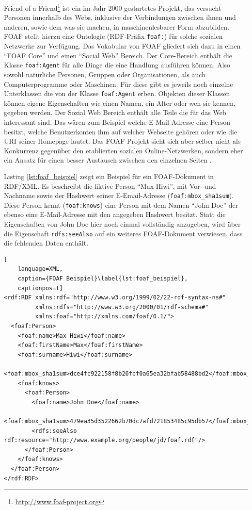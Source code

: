Friend of a Friend\footnote{\url{http://www.foaf-project.org}} ist ein im Jahr 2000 gestartetes Projekt, das versucht Personen innerhalb des Webs, inklusive der Verbindungen zwischen ihnen und anderen, sowie dem was sie machen, in maschinenlesbarer Form abzubilden. FOAF stellt hierzu eine Ontologie \cite{Brickley2010} (RDF-Präfix \texttt{foaf:}) für solche sozialen Netzwerke zur Verfügung. Das Vokabular von FOAF gliedert sich dazu in einen \enquote{FOAF Core} und einen \enquote{Social Web} Bereich. Der Core-Bereich enthält die Klasse \texttt{foaf:Agent} für alle Dinge die eine Handlung ausführen können. Also sowohl natürliche Personen, Gruppen oder Organisationen, als auch Computerprogramme oder Maschinen. Für diese gibt es jeweils noch einzelne Unterklassen die von der Klasse \texttt{foaf:Agent} erben. Objekten dieser Klassen können eigene Eigenschaften wie einen Namen, ein Alter oder wen sie kennen, gegeben werden. Der Sozial Web Bereich enthält alle Teile die für das Web interessant sind. Das wären zum Beispiel welche E-Mail-Adresse eine Person besitzt, welche Benutzerkonten ihm auf welcher Webseite gehören oder wie die URI seiner Homepage lautet. Das FOAF Projekt sieht sich aber selber nicht als Konkurrenz gegenüber den etablierten sozialen Online-Netzwerken, sondern eher ein Ansatz für einen besser Austausch zwischen den einzelnen Seiten \cite[\enquote{Abstract}]{Brickley2010}.

Listing \ref{lst:foaf_beispiel} zeigt ein Beispiel für ein FOAF-Dokument in RDF/XML. Es beschreibt die fiktive Person \enquote{Max Hiwi}, mit Vor- und Nachname sowie der Hashwert seiner E-Email-Adresse (\texttt{foaf:mbox\_sha1sum}). Diese Person kennt (\texttt{foaf:knows}) eine Person mit dem Namen \enquote{John Doe} der ebenso eine E-Mail-Adresse mit den angegeben Hashwert besitzt. Statt die Eigenschaften von John Doe hier noch einmal vollständig anzugeben, wird über die Eigenschaft \texttt{rdfs:seeAlso} auf ein weiteres FOAF-Dokument verwiesen, dass die fehlenden Daten enthält. 

\begin{lstlisting}[
    language=XML,
    caption={FOAF Beispiel}\label{lst:foaf_beispiel},
    captionpos=t]
<rdf:RDF xmlns:rdf="http://www.w3.org/1999/02/22-rdf-syntax-ns#"
         xmlns:rdfs="http://www.w3.org/2000/01/rdf-schema#"
         xmlns:foaf="http://xmlns.com/foaf/0.1/">
  <foaf:Person>
    <foaf:name>Max Hiwi</foaf:name>
    <foaf:firstName>Max</foaf:firstName>
    <foaf:surname>Hiwi</foaf:surname>
    <foaf:mbox_sha1sum>dce4fc922158f8b26fbf0a65ea32bfab58488bd2</foaf:mbox_sha1sum>
    <foaf:knows>
      <foaf:Person>
        <foaf:name>John Doe</foaf:name>
        <foaf:mbox_sha1sum>479ea35d3522662b70dc7afd721853485c95db57</foaf:mbox_sha1sum>
        <rdfs:seeAlso rdf:resource="http://www.example.org/people/jd/foaf.rdf"/>
      </foaf:Person>
    </foaf:knows>
  </foaf:Person>
</rdf:RDF>
\end{lstlisting}

